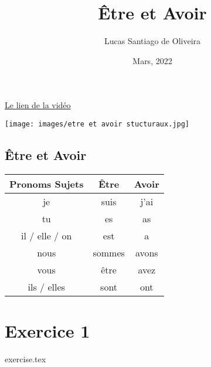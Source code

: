 \documentclass{article}
\title{Être et Avoir}
\author{Lucas Santiago de Oliveira}
\date{Mars, 2022}
\begin{document}
    \maketitle

    \vspace{2cm}

    \href{https://www.youtube.com/watch?v=Z2hZIJFg9v4}{Le lien de la vidéo}
    
    \texttt{[image: images/etre et avoir stucturaux.jpg]}
    \newpage

    \begin{center}
        \section*{Être et Avoir}
        \begin{tabular}{|c|c|c|}
            \hline
            Pronoms Sujets & Être & Avoir \\
            \hline
            je & suis & j'ai \\
            \hline
            tu & es & as \\ 
            \hline
            il / elle / on & est & a \\
            \hline
            nous & sommes & avons \\
            \hline
            vous & être & avez \\
            \hline
            ils / elles & sont & ont \\
            \hline
        \end{tabular}
    \end{center}

    \section*{Exercice 1}
    {exercise.tex}
\end{document}
